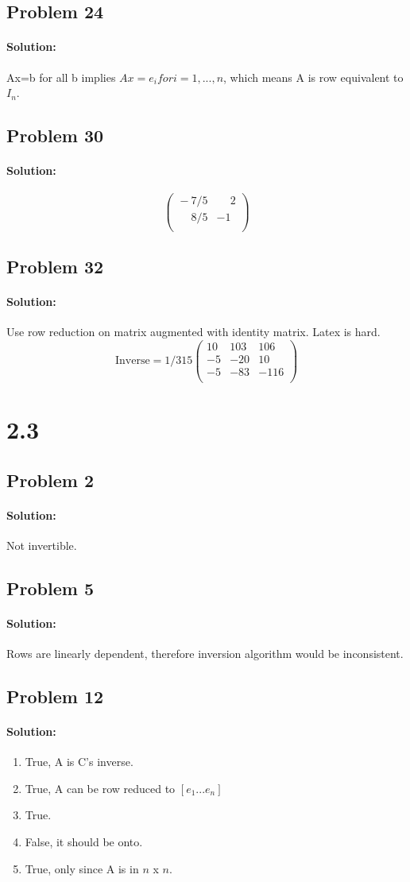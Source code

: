 \documentclass[11pt, notitlepage]{article}
\newenvironment{solution}{\paragraph{Solution:}}{\hfill}
\begin{document}
\subsection{Problem 24}
\begin{solution}
	Ax=b for all b implies $Ax=e_i for i =1,...,n$, which means A is row equivalent to $I_n$.
\end{solution}
\subsection{Problem 30}
\begin{solution}
	\[\left(\begin{matrix}{}
  -7/5&\phantom{-}2 \\
  \phantom{-}8/5&-1 \\
\end{matrix}\right)\]
\end{solution}
\subsection{Problem 32}
\begin{solution}
	Use row reduction on matrix augmented with identity matrix. Latex is hard.
	\[\text{Inverse}=1/315\left(\begin{matrix}{}
	10 & 103 & 106 \\
	-5 & -20 & 10 \\
	-5 & -83 & -116 \\
	\end{matrix}\right)\]
\end{solution}

\newpage
\section{2.3} 
\subsection{Problem 2}
\begin{solution}
	Not invertible.
\end{solution}
\subsection{Problem 5}
\begin{solution}
Rows are linearly dependent, therefore inversion algorithm would be inconsistent.
\end{solution}
\subsection{Problem 12}
\begin{solution}
	\begin{enumerate}[label=\alph*.)]
		\item True, A is C's inverse.
		\item True, A can be row reduced to $[e_1 ... e_n]$
		\item True.
		\item False, it should be onto.
		\item True, only since A is in $n$ x $n$.
	\end{enumerate}
\end{solution}
\end{document}
